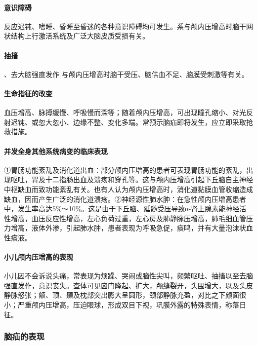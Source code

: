 \paragraph{意识障碍}

反应迟钝、嗜睡、昏睡至昏迷的各种意识障碍均可发生。系与颅内压增高时脑干网状结构上行激活系统及广泛大脑皮质受损有关。

\paragraph{抽搐}

、去大脑强直发作 与颅内压增高时脑干受压、脑供血不足、脑膜受刺激等有关。

\paragraph{生命指征的改变}

血压增高、脉搏缓慢、呼吸慢而深等；随着颅内压增高，可出现瞳孔缩小、对光反射迟钝、或忽大忽小、边缘不整、变化多端。常预示脑疝即将发生，应立即采取抢救措施。

\paragraph{并发全身其他系统病变的临床表现}

①胃肠功能紊乱及消化道出血：部分颅内压增高的患者可表现胃肠功能的紊乱，出现呕吐，胃及十二指肠出血及溃疡和穿孔等。这与颅内压增高引起下丘脑自主神经中枢缺血而致功能紊乱有关。也有人认为颅内压增高时，消化道黏膜血管收缩造成缺血，因而产生广泛的消化道溃疡。②神经源性肺水肿：在急性颅内压增高患者中，发生率高达5\%～10\%。这是由于下丘脑、延髓受压导致α-肾上腺素能神经活性增高，血压反应性增高，左心负荷过重，左心房及肺静脉压增高，肺毛细血管压力增高，液体外渗，引起肺水肿，患者表现为呼吸急促，痰鸣，并有大量泡沫状血性痰液。

\paragraph{小儿颅内压增高的表现}

小儿因不会诉说头痛，常表现为烦躁、哭闹或脑性尖叫，频繁呕吐、抽搐以至去脑强直发作，意识丧失。查体可见囟门隆起、扩大，颅缝裂开，头围增大，以及头皮静脉怒张；额、顶、颞及枕部突出膨大呈圆形，颈部静脉充盈，对比之下颜面很小；严重颅内压增高，压迫眼球，形成双目下视，巩膜外露的特殊表情，称落日征。

\subsubsection{脑疝的表现}

